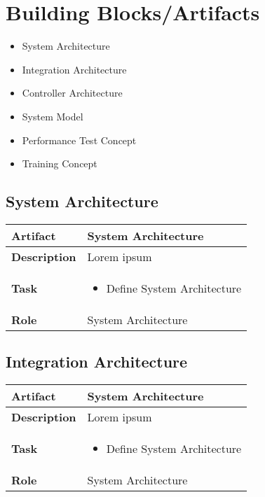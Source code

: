\section{Building Blocks/Artifacts}

\begin{itemize}
	\item System Architecture
	\item Integration Architecture
	\item Controller Architecture
	\item System Model
	\item Performance Test Concept
	\item Training Concept
\end{itemize}

\subsection{System Architecture}
 \label{table:ch6_Role_Service_Developer}
\begin{tabular}
	{|m{2cm}|m{10cm}|} \hline \bfseries Artifact & System Architecture\\
	\hline \bfseries Description & Lorem ipsum\\
	\hline \bfseries Task & 
	\begin{itemize}
		\item Define System Architecture 
	\end{itemize}
	\\
	\hline \bfseries Role & System Architecture\\
	\hline 
\end{tabular}

\subsection{Integration Architecture}
 \label{table:ch6_Role_Service_Developer}
\begin{tabular}
	{|m{2cm}|m{10cm}|} \hline \bfseries Artifact & System Architecture\\
	\hline \bfseries Description & Lorem ipsum\\
	\hline \bfseries Task & 
	\begin{itemize}
		\item Define System Architecture 
	\end{itemize}
	\\
	\hline \bfseries Role & System Architecture\\
	\hline 
\end{tabular}

